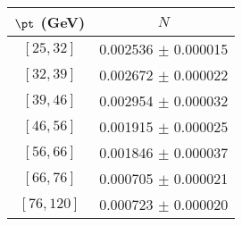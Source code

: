 \begin{tabular}{c||c}
$\pt$ (GeV) & $N$  \\
\hline
$[25, 32]$ & 0.002536 $\pm$ 0.000015\\
$[32, 39]$ & 0.002672 $\pm$ 0.000022\\
$[39, 46]$ & 0.002954 $\pm$ 0.000032\\
$[46, 56]$ & 0.001915 $\pm$ 0.000025\\
$[56, 66]$ & 0.001846 $\pm$ 0.000037\\
$[66, 76]$ & 0.000705 $\pm$ 0.000021\\
$[76, 120]$ & 0.000723 $\pm$ 0.000020\\
\end{tabular}
